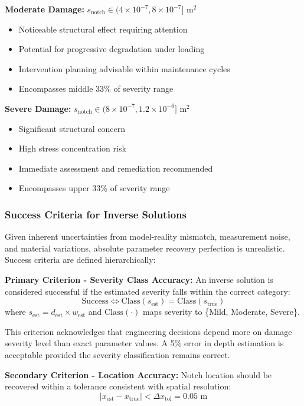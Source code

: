 \documentclass[12pt,a4paper]{report}
\begin{document}
\textbf{Moderate Damage:} $s_{\text{notch}} \in (4 \times 10^{-7}, 8 \times 10^{-7}]$ m$^2$
\begin{itemize}
    \item Noticeable structural effect requiring attention
    \item Potential for progressive degradation under loading
    \item Intervention planning advisable within maintenance cycles
    \item Encompasses middle 33\% of severity range
\end{itemize}

\textbf{Severe Damage:} $s_{\text{notch}} \in (8 \times 10^{-7}, 1.2 \times 10^{-6}]$ m$^2$
\begin{itemize}
    \item Significant structural concern
    \item High stress concentration risk
    \item Immediate assessment and remediation recommended
    \item Encompasses upper 33\% of severity range
\end{itemize}

\subsubsection{Success Criteria for Inverse Solutions}
Given inherent uncertainties from model-reality mismatch, measurement noise, and material variations, absolute parameter recovery perfection is unrealistic. Success criteria are defined hierarchically:

\textbf{Primary Criterion - Severity Class Accuracy:}
An inverse solution is considered successful if the estimated severity falls within the correct category:
\begin{equation}
\text{Success} \Leftrightarrow \text{Class}(s_{\text{est}}) = \text{Class}(s_{\text{true}})
\label{eq:success_criterion}
\end{equation}
where $s_{\text{est}} = d_{\text{est}} \times w_{\text{est}}$ and $\text{Class}(\cdot)$ maps severity to \{Mild, Moderate, Severe\}.

This criterion acknowledges that engineering decisions depend more on damage severity level than exact parameter values. A 5\% error in depth estimation is acceptable provided the severity classification remains correct.

\textbf{Secondary Criterion - Location Accuracy:}
Notch location should be recovered within a tolerance consistent with spatial resolution:
\begin{equation}
|x_{\text{est}} - x_{\text{true}}| < \Delta x_{\text{tol}} = 0.05 \text{ m}
\label{eq:location_tolerance}
\end{equation}
\end{document}
